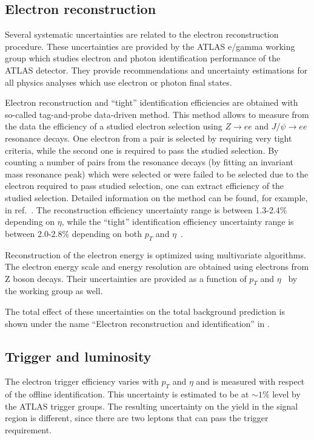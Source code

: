 \subsection{Electron reconstruction}
\label{subsec:elec_reco_system}
Several systematic uncertainties are related to the electron reconstruction procedure.
These uncertainties are provided by the ATLAS e/gamma working group which studies electron and photon identification performance of the ATLAS detector.
They provide recommendations and uncertainty estimations for all physics analyses which use electron or photon final states.

Electron reconstruction and ``tight'' identification efficiencies are obtained with so-called tag-and-probe data-driven method.
This method allows to measure from the data the efficiency of a studied electron selection using $Z \to e e$ and $J/\psi \to e e$ resonance decays. 
One electron from a pair is selected by requiring very tight criteria, 
while the second one is required to pass the studied selection.
By counting a number of pairs from the resonance decays (by fitting an invariant mass resonance peak) which were selected or were failed to be selected due to the electron required to pass studied selection, one can extract efficiency of the studied selection. Detailed information on the method can be found, for example, in ref.~\cite{tag-and-probe}.
The reconstruction efficiency uncertainty range is between 1.3-2.4\% depending on $\eta$, while the 
``tight'' identification efficiency uncertainty range is between 2.0-2.8\% depending on both $p_T$ and $\eta$~\cite{electron_reco_id_2011}.

Reconstruction of the electron energy is optimized using multivariate algorithms.
The electron energy scale and energy resolution are obtained using electrons from Z boson decays.
Their uncertainties are provided as a function of $p_T$ and $\eta$~\cite{electron_energy_errors_Run1} 
by the working group as well.

The total effect of these uncertainties on the total background prediction 
is shown under the name ``Electron reconstruction and identification'' in .

\subsection{Trigger and luminosity}
The electron trigger efficiency varies with $p_T$ and $\eta$ and is measured with respect of the offline identification.
This uncertainty is estimated to be at $\sim1\%$ level by the ATLAS trigger groups.
The resulting uncertainty on the yield in the signal region is different, since there are two leptons that can pass the trigger requirement. 

